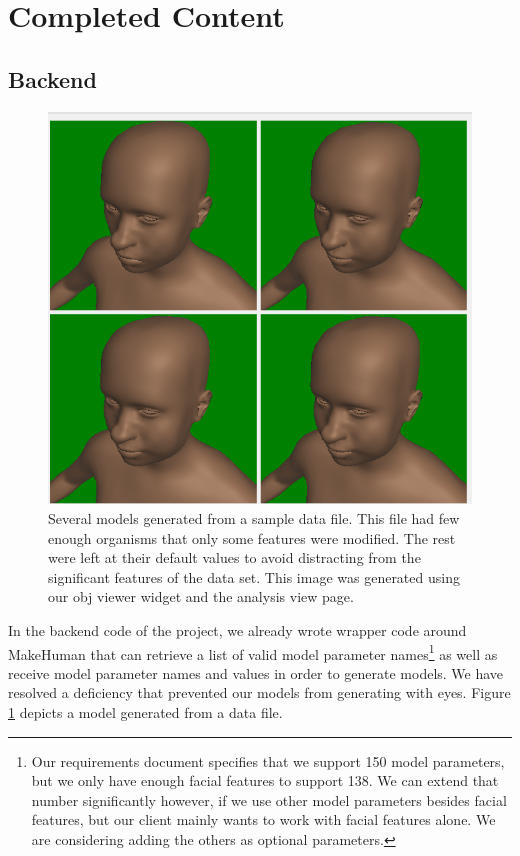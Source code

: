 \documentclass[letterpaper,10pt, onecolumn, draftclsnofoot]{IEEEtran}
\begin{document}
\section{Completed Content}

\subsection{Backend}

\begin{figure}
	\includegraphics[width=\textwidth]{analysis.PNG}
	\caption{Several models generated from a sample data file. This file had few enough organisms that only some features were modified. The rest were left at their default values to avoid distracting from the significant features of the data set. This image was generated using our obj viewer widget and the analysis view page.}
	\label{fig:generated}
\end{figure}

In the backend code of the project, we already wrote wrapper code around MakeHuman that can retrieve a list of valid model parameter names\footnote{Our requirements document specifies that we support 150 model parameters, but we only have enough facial features to support 138. We can extend that number significantly however, if we use other model parameters besides facial features, but our client mainly wants to work with facial features alone. We are considering adding the others as optional parameters.} as well as receive model parameter names and values in order to generate models. We have resolved a deficiency that prevented our models from generating with eyes. Figure \ref{fig:generated} depicts a model generated from a data file.
\end{document}
